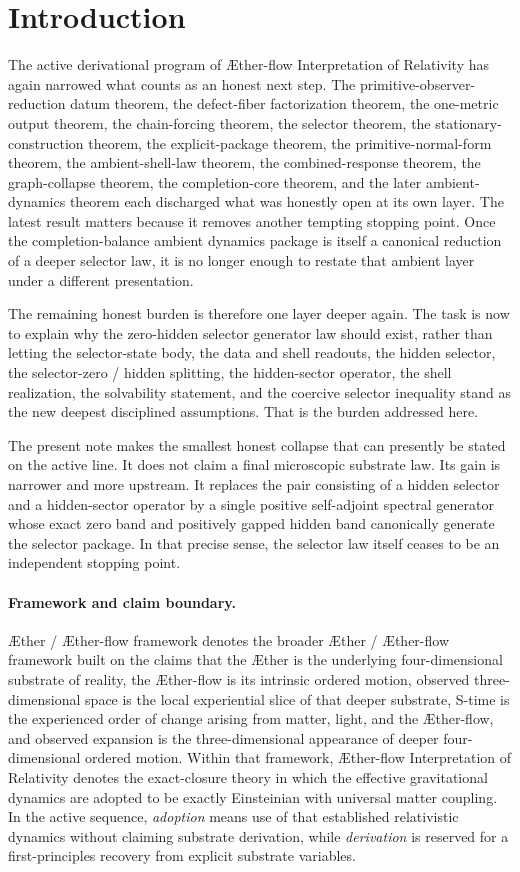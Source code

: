 \documentclass[11pt]{article}
\newcommand{\Aether}{\AE{}ther}
\newcommand{\Aflow}{\AE{}ther-flow}
\newcommand{\TheoryName}{\Aflow{} Interpretation of Relativity}
\newcommand{\TheoryProgram}{\Aether{} / \Aflow{} framework}
\begin{document}
\section{Introduction}

The active derivational program of \TheoryName{} has again narrowed what counts as an honest next step. The primitive-observer-reduction datum theorem, the defect-fiber factorization theorem, the one-metric output theorem, the chain-forcing theorem, the selector theorem, the stationary-construction theorem, the explicit-package theorem, the primitive-normal-form theorem, the ambient-shell-law theorem, the combined-response theorem, the graph-collapse theorem, the completion-core theorem, and the later ambient-dynamics theorem each discharged what was honestly open at its own layer. The latest result matters because it removes another tempting stopping point. Once the completion-balance ambient dynamics package is itself a canonical reduction of a deeper selector law, it is no longer enough to restate that ambient layer under a different presentation.

The remaining honest burden is therefore one layer deeper again. The task is now to explain why the zero-hidden selector generator law should exist, rather than letting the selector-state body, the data and shell readouts, the hidden selector, the selector-zero / hidden splitting, the hidden-sector operator, the shell realization, the solvability statement, and the coercive selector inequality stand as the new deepest disciplined assumptions. That is the burden addressed here.

The present note makes the smallest honest collapse that can presently be stated on the active line. It does not claim a final microscopic substrate law. Its gain is narrower and more upstream. It replaces the pair consisting of a hidden selector and a hidden-sector operator by a single positive self-adjoint spectral generator whose exact zero band and positively gapped hidden band canonically generate the selector package. In that precise sense, the selector law itself ceases to be an independent stopping point.

\paragraph{Framework and claim boundary.}
\TheoryProgram{} denotes the broader \Aether{} / \Aflow{} framework built on the claims that the \Aether{} is the underlying four-dimensional substrate of reality, the \Aflow{} is its intrinsic ordered motion, observed three-dimensional space is the local experiential slice of that deeper substrate, S-time is the experienced order of change arising from matter, light, and the \Aflow{}, and observed expansion is the three-dimensional appearance of deeper four-dimensional ordered motion. Within that framework, \TheoryName{} denotes the exact-closure theory in which the effective gravitational dynamics are adopted to be exactly Einsteinian with universal matter coupling. In the active sequence, \emph{adoption} means use of that established relativistic dynamics without claiming substrate derivation, while \emph{derivation} is reserved for a first-principles recovery from explicit substrate variables.
\end{document}

